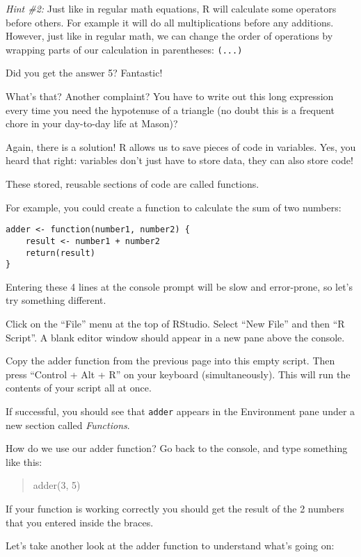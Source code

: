 \documentclass[
]{book}
\begin{document}
\emph{Hint \#2:} Just like in regular math equations, R will calculate some operators before others. For example it will do all multiplications before any additions. However, just like in regular math, we can change the order of operations by wrapping parts of our calculation in parentheses: \texttt{(...)}

Did you get the answer 5? Fantastic!

What's that? Another complaint? You have to write out this long expression every time you need the hypotenuse of a triangle (no doubt this is a frequent chore in your day-to-day life at Mason)?

Again, there is a solution! R allows us to save pieces of code in variables. Yes, you heard that right: variables don't just have to store data, they can also store code!

These stored, reusable sections of code are called functions.

For example, you could create a function to calculate the sum of two numbers:

\begin{verbatim}
adder <- function(number1, number2) {
    result <- number1 + number2
    return(result)
}
\end{verbatim}

Entering these 4 lines at the console prompt will be slow and error-prone, so let's try something different.

Click on the ``File'' menu at the top of RStudio. Select ``New File'' and then ``R Script''. A blank editor window should appear in a new pane above the console.

Copy the adder function from the previous page into this empty script. Then press ``Control + Alt + R'' on your keyboard (simultaneously). This will run the contents of your script all at once.

If successful, you should see that \texttt{adder} appears in the Environment pane under a new section called \emph{Functions}.

How do we use our adder function? Go back to the console, and type something like this:

\begin{quote}
adder(3, 5)
\end{quote}

If your function is working correctly you should get the result of the 2 numbers that you entered inside the braces.

Let's take another look at the adder function to understand what's going on:
\end{document}
